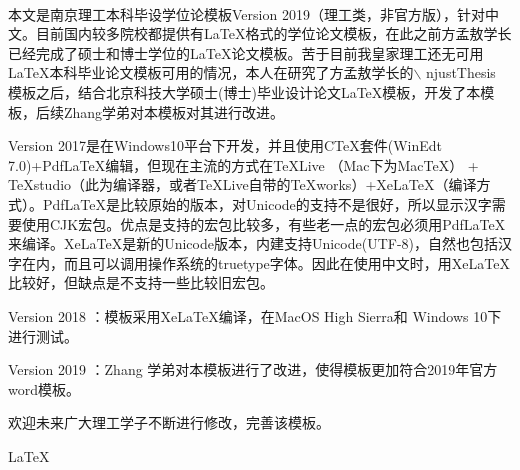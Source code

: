 


\fancyhead[LE,RO]{}
\fancyhead[RE,LO]{}
\cfoot{}
\thisfancypage{%
	\setlength{\fboxsep}{0pt}%
	\setlength{\fboxrule}{0.8pt}%
	\setlength{\shadowsize}{0pt}%
	\shadowbox}{}

\songti
\begin{spacing}{1.5}%
	\begin{center}
		\begin{minipage}[b]{0.95\linewidth}
			 \quad \\ [0.5ex]		
			 
\qquad 本文是南京理工本科毕设学位论模板Version 2019（理工类，非官方版），针对中文。目前国内较多院校都提供有\LaTeX 格式的学位论文模板，在此之前方孟敖学长已经完成了硕士和博士学位的\LaTeX 论文模板。苦于目前我皇家理工还无可用\LaTeX 本科毕业论文模板可用的情况，本人在研究了方孟敖学长的$\backslash$ njustThesis 模板之后，结合北京科技大学硕士(博士)毕业设计论文\LaTeX 模板，开发了本模板，后续Zhang学弟对本模板对其进行改进。
			
\qquad Version 2017是在Windows10平台下开发，并且使用CTeX套件(WinEdt 7.0)+PdfLaTeX编辑，但现在主流的方式在TeXLive （Mac下为MacTeX） + TeXstudio（此为编译器，或者TeXLive自带的TeXworks）+XeLaTeX（编译方式）。PdfLaTeX是比较原始的版本，对Unicode的支持不是很好，所以显示汉字需要使用CJK宏包。优点是支持的宏包比较多，有些老一点的宏包必须用PdfLaTeX来编译。XeLaTeX是新的Unicode版本，内建支持Unicode(UTF-8)，自然也包括汉字在内，而且可以调用操作系统的truetype字体。因此在使用中文时，用XeLaTeX比较好，但缺点是不支持一些比较旧宏包。

\qquad Version 2018 ：模板采用XeLaTeX编译，在MacOS High Sierra和 Windows 10下进行测试。

\qquad Version 2019 ：Zhang 学弟对本模板进行了改进，使得模板更加符合2019年官方word模板。

\qquad 欢迎未来广大理工学子不断进行修改，完善该模板。
			
\vspace{8ex}
  \songti \qquad \LaTeX  \qquad \CTeX
		\end{minipage}
	\end{center}
\end{spacing}



